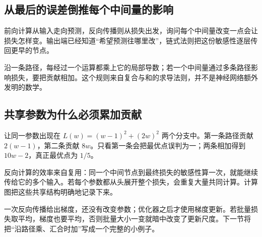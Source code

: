 \subsection*{从最后的误差倒推每个中间量的影响}
前向计算从输入走向预测，反向传播则从损失出发，询问每个中间量改变一点会让损失怎样变。输出端已经知道“希望预测往哪里改”，链式法则把这份敏感性逐层传回更早的节点。

沿一条路径，每经过一个运算都乘上它的局部导数；若一个中间量通过多条路径影响损失，要把贡献相加。这个规则来自复合与和的求导法则，并不是神经网络额外发明的数学。

\subsection*{共享参数为什么必须累加贡献}
让同一参数出现在 $L(w)=(w-1)^2+(2w)^2$ 两个分支中。第一条路径贡献 $2(w-1)$，第二条贡献 $8w$。只看第一条会把最优点误判为一；两条相加得到 $10w-2$，真正最优点为 $1/5$。

反向计算的效率来自复用：同一个中间节点到最终损失的敏感性算一次，就能继续传给它的多个输入。若每个参数都从头展开整个损失，会重复大量共同计算。计算图把这些共享结构明确地记录下来。

一次反向传播给出梯度，还没有改变参数；优化器之后才使用梯度更新。若批量损失取平均，梯度也要平均，否则批量大小一变就暗中改变了更新尺度。下一节将把“沿路径乘、汇合时加”写成一个完整的小例子。
